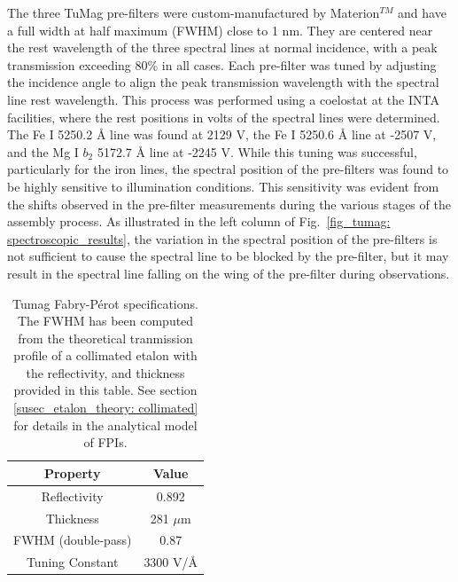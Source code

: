 The three TuMag pre-filters were custom-manufactured by Materion$^{TM}$ and have a full width at half maximum (FWHM) close to 1 nm. They are centered near the rest wavelength of the three spectral lines at normal incidence, with a peak transmission exceeding 80\% in all cases. Each pre-filter was tuned by adjusting the incidence angle to align the peak transmission wavelength with the spectral line rest wavelength. This process was performed using a coelostat at the INTA facilities, where the rest positions in volts of the spectral lines were determined. The Fe I 5250.2 \r{A} line was found at 2129 V, the Fe I 5250.6 \r{A} line at -2507 V, and the Mg I $b_2$ 5172.7 \r{A} line at -2245 V. While this tuning was successful, particularly for the iron lines, the spectral position of the pre-filters was found to be highly sensitive to illumination conditions. This sensitivity was evident from the shifts observed in the pre-filter measurements during the various stages of the assembly process. As illustrated in the left column of Fig.~\ref{fig_tumag: spectroscopic_results}, the variation in the spectral position of the pre-filters is not sufficient to cause the spectral line to be blocked by the pre-filter, but it may result in the spectral line falling on the wing of the pre-filter during observations.

\begin{table}
    \centering
   \begin{tabular}{cc}
    \hline
    \hline
    Property & Value \\
    \hline
    Reflectivity & 0.892 \\
    Thickness & 281 $\mu$m\\
    FWHM (double-pass) & 0.87\\
    Tuning Constant & 3300 V/\r{A}\\
    \hline
    \hline
    \end{tabular}
    \caption{Tumag Fabry-Pérot specifications. The FWHM has been computed from the theoretical tranmission profile of a collimated etalon with the reflectivity, and thickness provided in this table. See section \ref{susec_etalon_theory: collimated} for details in the analytical model of FPIs.}
    \label{table: Tumags etalon}
\end{table}


